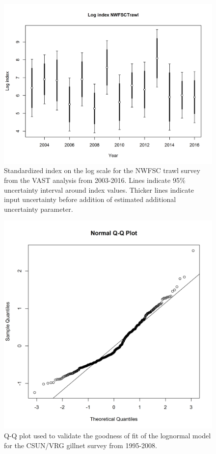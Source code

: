 \documentclass[12pt,]{article}
\begin{document}
\begin{figure}[htbp]
\centering
\includegraphics{r4ss/plots_mod1/index4_logcpuedata_NWFSCtrawl.png}
\caption{Standardized index on the log scale for the NWFSC trawl survey
from the VAST analysis from 2003-2016. Lines indicate 95\% uncertainty
interval around index values. Thicker lines indicate input uncertainty
before addition of estimated additional uncertainty parameter.
\label{fig:index4_logcpuedata_NWFSCtrawl}}
\end{figure}

\FloatBarrier

\begin{figure}[htbp]
\centering
\includegraphics{Figures/Fleet9_GillnetSurvey_QQ.png}
\caption{Q-Q plot used to validate the goodness of fit of the lognormal
model for the CSUN/VRG gillnet survey from 1995-2008.
\label{fig:Fleet9_GillnetSurvey_QQ}}
\end{figure}
\end{document}

